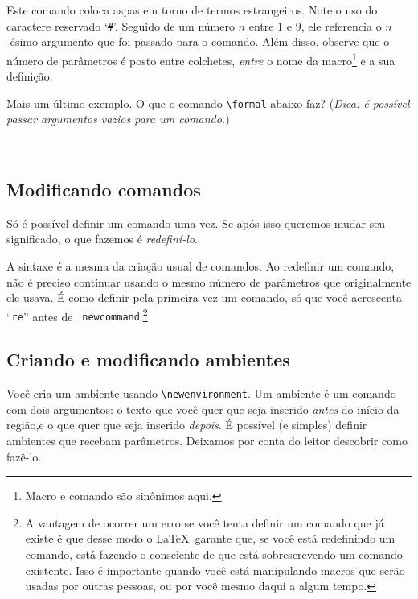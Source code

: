 Este comando coloca aspas em torno de termos estrangeiros. Note o uso
do caractere reservado `{\tt\#}'. Seguido de um número $n$ entre $1$ e
$9$, ele referencia o $n$-ésimo argumento que foi passado para o
comando. Além disso, observe que o número de parâmetros é posto entre
colchetes, \emph{entre} o nome da macro\footnote{Macro e comando são
    sinônimos aqui.} e a sua definição.

Mais um último exemplo. O que o comando \verb'\formal' abaixo faz?
(\emph{Dica: é possível passar argumentos vazios para um comando.})

\begin{ttsample}
  \\
\end{ttsample}

\subsection{Modificando comandos}

Só é possível definir um comando uma vez. Se após isso queremos mudar
seu significado, o que fazemos é \emph{redefiní-lo}.
\begin{ttsample}
\end{ttsample}

A sintaxe é a mesma da criação usual de comandos. Ao redefinir um
comando, não é preciso continuar usando o mesmo número de parâmetros
que originalmente ele usava. É como definir pela primeira vez um
comando, só que você acrescenta ``{\tt re}'' antes de {\tt
  newcommand}.\footnote{A vantagem de ocorrer um erro se você tenta
  definir um comando que já existe é que desse modo o \LaTeX\ garante
  que, se você está redefinindo um comando, está fazendo-o consciente
  de que está sobrescrevendo um comando existente. Isso é importante
  quando você está manipulando macros que serão usadas por outras
  pessoas, ou por você mesmo daqui a algum tempo.}

\subsection{Criando e modificando ambientes}

Você cria um ambiente usando \verb'\newenvironment'. Um ambiente é um
comando com dois argumentos: o texto que você quer que seja inserido
\emph{antes} do início da região,e o que quer que seja inserido
\emph{depois}. É possível (e simples) definir ambientes que recebam
parâmetros. Deixamos por conta do leitor descobrir como fazê-lo.

